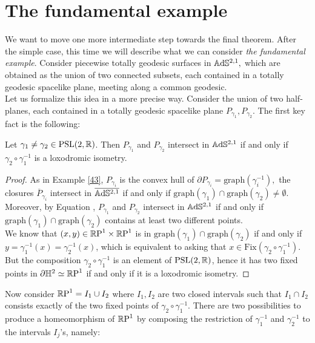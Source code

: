 \section{The fundamental example}\label{fundamentalexamplesec} We want to move one more intermediate step towards the final theorem. After the simple case, this time we will describe what we can consider \textit{the fundamental example}. Consider piecewise totally geodesic surfaces in $\A^{2,1},$ which are obtained as the union of two connected subsets, each contained in a totally geodesic spacelike plane, meeting along a common geodesic. \\
Let us formalize this idea in a more precise way. Consider the union of two half-planes, each contained in a totally geodesic spacelike plane $P_{\gamma_1},P_{\gamma_2}$. The first key fact is the following:

\begin{lemma}\label{Mati}
    Let $\gamma_1\neq\gamma_2\in\PSL$. Then $P_{\gamma_1}$ and $P_{\gamma_2}$ intersect in $\A^{2,1}$ if and only if $\gamma_2\circ{\gamma_1^{-1}}$ is a loxodromic isometry. 
\end{lemma}
\begin{proof}
    As in Example \ref{43}, $P_{\gamma_i}$ is the convex hull of $\partial P_{\gamma_i}=\text{graph}(\gamma_i^{-1}),$ the closures $\overline{P}_{\gamma_i}$  intersect in $\overline{\A^{2,1}}$ if and only if $\text{graph}(\gamma_1)\cap\text{graph}(\gamma_2)\neq\emptyset$. Moreover, by Equation , $P_{\gamma_1}$ and $P_{\gamma_2}$ intersect in $\A^{2,1}$ if and only if $\text{graph}(\gamma_1)\cap\text{graph}(\gamma_2)$ contains at least two different points. \\
    We know that $(x,y)\in\T$ is in $\text{graph}(\gamma_1)\cap\text{graph}(\gamma_2)$ if and only if $y=\gamma_1^{-1}(x)=\gamma_2^{-1}(x)$, which is equivalent to asking that $x\in\text{Fix}(\gamma_2\circ\gamma_1^{-1})$. But the composition $\gamma_2\circ\gamma_1^{-1}$ is an element of $\PSL$, hence it has two fixed points in $\partial\H^2\simeq\S$ if and only if it is a loxodromic isometry.
\end{proof}

Now consider $\S=I_1\cup I_2$ where $I_1,I_2$ are two closed intervals such that $I_1\cap I_2$ consists exactly of the two fixed points of $\gamma_2\circ\gamma_1^{-1}.$ There are two possibilities to produce a homeomorphism of $\S$ by composing the restriction of $\gamma_1^{-1}$ and $\gamma_2^{-1}$ to the intervals $I_j$'s, namely: 

